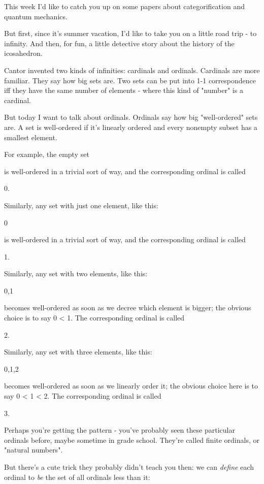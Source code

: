 

 
This week I'd like to catch you up on some papers about 
categorification and quantum mechanics.  

But first, since it's summer vacation, I'd like to take you on
a little road trip - to infinity.  And then, for fun, a little
detective story about the history of the icosahedron.

Cantor invented two kinds of infinities: cardinals and ordinals.  
Cardinals are more familiar.  They say how big sets are.  Two sets 
can be put into 1-1 correspondence iff they have the same number of 
elements - where this kind of "number" is a cardinal.  

But today I want to talk about ordinals.  Ordinals say how big 
"well-ordered" sets are.  A set is well-ordered if it's linearly 
ordered and every nonempty subset has a smallest element.  

For example, the empty set

{}

is well-ordered in a trivial sort of way, and the corresponding 
ordinal is called 

0.

Similarly, any set with just one element, like this:

{0}

is well-ordered in a trivial sort of way, and the corresponding 
ordinal is called

1.

Similarly, any set with two elements, like this:

{0,1}

becomes well-ordered as soon as we decree which element is bigger; 
the obvious choice is to say 0 < 1.  The corresponding ordinal is 
called 

2.  

Similarly, any set with three elements, like this:

{0,1,2}

becomes well-ordered as soon as we linearly order it; the obvious
choice here is to say 0 < 1 < 2.  The corresponding ordinal is called

3.  

Perhaps you're getting the pattern - you've probably seen these 
particular ordinals before, maybe sometime in grade school.  
They're called finite ordinals, or "natural numbers".

But there's a cute trick they probably didn't teach you then: we can
\emph{define} each ordinal to \emph{be} the set of all ordinals
less than it:


